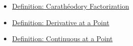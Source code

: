 \begin{dependencies}
\begin{itemize}
  \item \hyperref[def:caratheodory-factorization]{Definition: Carath\'{e}odory Factorization}
  \item \hyperref[def:derivative-at-a-point]{Definition: Derivative at a Point}
  \item \hyperref[def:continuous-at-point]{Definition: Continuous at a Point}
\end{itemize}
\end{dependencies}

